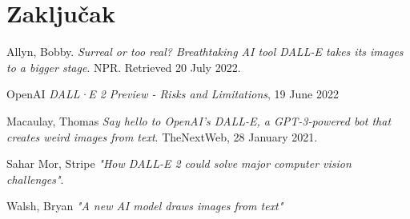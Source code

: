 \documentclass[a4paper]{article}
\begin{document}
\section{Zaključak}

\appendix

\begin{thebibliography}{9}

 Allyn, Bobby. \emph{ Surreal or too real? Breathtaking AI tool DALL-E takes its images to a bigger stage}. NPR. Retrieved 20 July 2022.

  OpenAI \emph{  DALL·E 2 Preview - Risks and Limitations}, 19 June 2022 

  Macaulay, Thomas \emph{ Say hello to OpenAI's DALL-E, a GPT-3-powered bot that creates weird images from text}. TheNextWeb, 28 January 2021.

 Sahar Mor, Stripe \emph {"How DALL-E 2 could solve major computer vision challenges"}.

 Walsh, Bryan \emph{ "A new AI model draws images from text"}


\end{thebibliography}



\appendix
\end{document}
